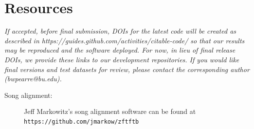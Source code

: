 \documentclass[10pt,letterpaper]{article}
\let\oldmarginpar\marginpar
\renewcommand{\marginpar}[1]{\oldmarginpar{\linespread{1}\scriptsize{#1}}}
\begin{document}
\appendix

\section{Resources}
\label{sec:resources}

{\em If accepted, before final submission, DOIs for the latest code will be created as described in https://guides.github.com/activities/citable-code/ so that our results may be reproduced and the software deployed.  For now, in lieu of final release DOIs, we provide these links to our development repositories.  If you would like final versions and test datasets for review, please contact the corresponding author (bwpearre@bu.edu).}
\begin{description}
  \item[Song alignment:] Jeff Markowitz's song alignment software \cite{Poole2012} can be found at
    {\tt https://github.com/jmarkow/zftftb}
\end{description}
\end{document}
